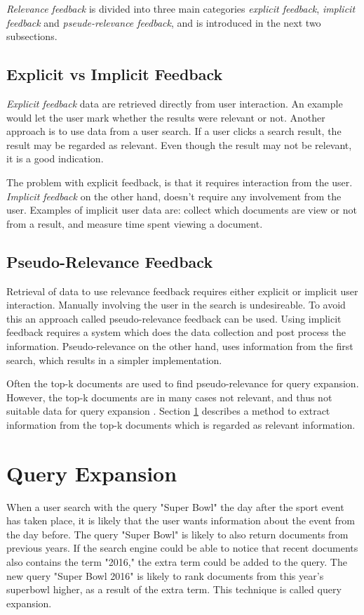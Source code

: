 \textit{Relevance feedback} is divided into three main categories \textit{explicit feedback}, \textit{implicit feedback} and \textit{pseude-relevance feedback},
and is introduced in the next two subsections.

\subsection{Explicit vs Implicit Feedback}
\textit{Explicit feedback} data are retrieved directly from user interaction.
An example would let the user mark whether the results were relevant or not.
Another approach is to use data from a user search.
If a user clicks a search result, the result may be regarded as relevant.
Even though the result may not be relevant, it is a good indication.

The problem with explicit feedback, is that it requires interaction from the user.
\textit{Implicit feedback} on the other hand, doesn't require any involvement from the user.
Examples of implicit user data are:
collect which documents are view or not from a result, and measure time spent viewing a document.

\subsection{Pseudo-Relevance Feedback}
Retrieval of data to use relevance feedback requires either explicit or implicit user interaction.
Manually involving the user in the search is undesireable.
To avoid this an approach called pseudo-relevance feedback can be used.
Using implicit feedback requires a system which does the data collection and post process the information.
Pseudo-relevance on the other hand, uses information from the first search, which results in a simpler implementation.

Often the top-k documents are used to find pseudo-relevance for query expansion.
However, the top-k documents are in many cases not relevant, and thus not suitable data for query expansion \cite{pseudo-relevance-invalid}.
Section \ref{sec:query-expansion} describes a method to extract information from the top-k documents which is regarded as relevant information.

\section{Query Expansion}
\label{sec:query-expansion}
When a user search with the query "Super Bowl" the day after the sport event has taken place,
it is likely that the user wants information about the event from the day before.
The query "Super Bowl" is likely to also return documents from previous years.
If the search engine could be able to notice that recent documents also contains the term "2016,"
the extra term could be added to the query.
The new query "Super Bowl 2016" is likely to rank documents from this year's superbowl higher, as a result of the extra term.
This technique is called query expansion.

